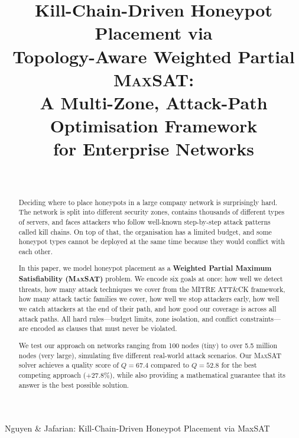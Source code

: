 \documentclass[journal]{IEEEtran}
\newcommand{\maxsat}{\textsc{MaxSAT}}
\begin{document}
\title{Kill-Chain-Driven Honeypot Placement via\\
       Topology-Aware Weighted Partial \textsc{MaxSAT}:\\
       A Multi-Zone, Attack-Path Optimisation Framework\\
       for Enterprise Networks}

\author{
  \\
}

%
{Nguyen \& Jafarian: Kill-Chain-Driven Honeypot Placement via MaxSAT}

\maketitle

\begin{abstract}
Deciding where to place honeypots in a large company network
is surprisingly hard.
The network is split into different security zones, contains
thousands of different types of servers, and faces attackers
who follow well-known step-by-step attack patterns called
kill chains.
On top of that, the organisation has a limited budget, and
some honeypot types cannot be deployed at the same time
because they would conflict with each other.

In this paper, we model honeypot placement as a
\textbf{Weighted Partial Maximum Satisfiability (\maxsat{})}
problem.
We encode six goals at once: how well we detect threats,
how many attack techniques we cover from the MITRE ATT\&CK
framework, how many attack tactic families we cover, how well
we stop attackers early, how well we catch attackers at the
end of their path, and how good our coverage is across all
attack paths.
All hard rules---budget limits, zone isolation, and conflict
constraints---are encoded as clauses that must never be
violated.

We test our approach on networks ranging from 100 nodes
(tiny) to over 5.5 million nodes (very large), simulating five
different real-world attack scenarios.
Our \maxsat{} solver achieves a quality score of $Q = 67.4$
compared to $Q = 52.8$ for the best competing approach
($+27.8\%$), while also providing a mathematical guarantee
that its answer is the best possible solution.
\end{abstract}
\end{document}

